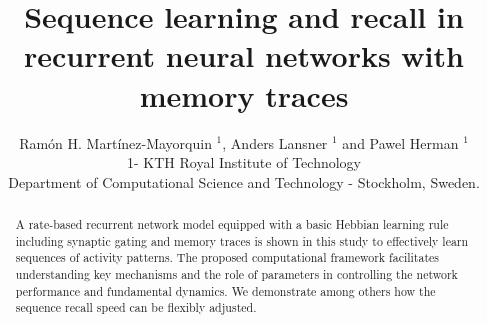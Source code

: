 \documentclass[a4paper]{esannV2}
\begin{document}
\title{Sequence learning and recall in recurrent neural networks with memory traces}

\author{Ram\'on H. Mart\'inez-Mayorquin $^1$, Anders Lansner $^1$ and Pawel Herman $^1$
%
%
\vspace{.3cm}\\
%
1- KTH Royal Institute of Technology \\
Department of Computational Science and Technology - Stockholm, Sweden.
%
\vspace{.1cm}\\ 
}


\maketitle

\begin{abstract} A rate-based recurrent network model equipped with a basic Hebbian learning rule including synaptic gating and memory traces is shown in this study to effectively learn sequences of activity patterns. The proposed computational framework facilitates understanding key mechanisms and the role of parameters in controlling the network performance and fundamental dynamics. We demonstrate among others how the sequence recall speed can be flexibly adjusted. 
\end{abstract}
\end{document}
